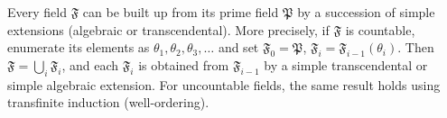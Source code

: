 Every field $\mathfrak{F}$ can be built up from its prime field $\mathfrak{P}$ by a succession of simple extensions (algebraic or transcendental). More precisely, if $\mathfrak{F}$ is countable, enumerate its elements as $\theta_1, \theta_2, \theta_3, \ldots$ and set $\mathfrak{F}_0 = \mathfrak{P}$, $\mathfrak{F}_i = \mathfrak{F}_{i-1}(\theta_i)$. Then $\mathfrak{F} = \bigcup_i \mathfrak{F}_i$, and each $\mathfrak{F}_i$ is obtained from $\mathfrak{F}_{i-1}$ by a simple transcendental or simple algebraic extension. For uncountable fields, the same result holds using transfinite induction (well-ordering).
